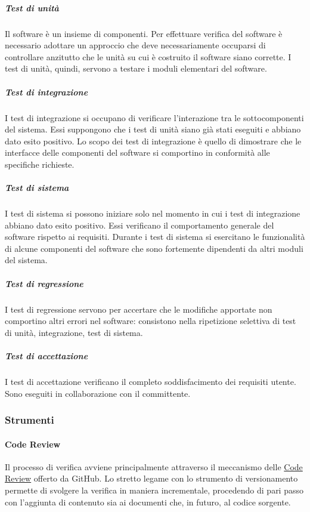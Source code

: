 \documentclass[../../norme-di-progetto.tex]{subfiles}
\begin{document}
\subparagraph{Test di unità}%
\label{subp:test_di_unita}
Il software è un insieme di componenti. Per effettuare verifica del software è necessario adottare un approccio  che deve necessariamente occuparsi di controllare anzitutto che le unità su cui è costruito il software siano corrette. I test di unità, quindi, servono a testare i moduli elementari del software.

\subparagraph{Test di integrazione}%
\label{subp:test_di_integrazione}
I test di integrazione si occupano di verificare l'interazione tra le sottocomponenti del sistema.
Essi suppongono che i test di unità siano già stati eseguiti e abbiano dato esito positivo.
Lo scopo dei test di integrazione è quello di dimostrare che le interfacce delle componenti del software si comportino in conformità alle specifiche richieste.

\subparagraph{Test di sistema}%
\label{test_di_sistema}
I test di sistema si possono iniziare solo nel momento in cui i test di integrazione abbiano dato esito positivo.
Essi verificano il comportamento generale del software rispetto ai requisiti.
Durante i test di sistema si esercitano le funzionalità di alcune componenti del software che sono fortemente dipendenti da altri moduli del sistema.

\subparagraph{Test di regressione}%
\label{test_di_regressione}
I test di regressione servono per accertare che le modifiche apportate non comportino altri errori nel software: consistono nella ripetizione selettiva di test di unità, integrazione, test di sistema.

\subparagraph{Test di accettazione}%
\label{test_di_accettazione}
I test di accettazione verificano il completo soddisfacimento dei requisiti utente.
Sono eseguiti in collaborazione con il committente.

\subsubsection{Strumenti}%
\label{subs:verifica/strumenti}

\paragraph{Code Review}%
\label{par:code_review}

Il processo di verifica avviene principalmente attraverso il meccanismo delle \href{https://github.com/features/code-review/}{Code Review} offerto da GitHub.
Lo stretto legame con lo strumento di versionamento permette di svolgere la verifica in maniera incrementale, procedendo di pari passo con l'aggiunta di contenuto sia ai documenti che, in futuro, al codice sorgente.
\end{document}
